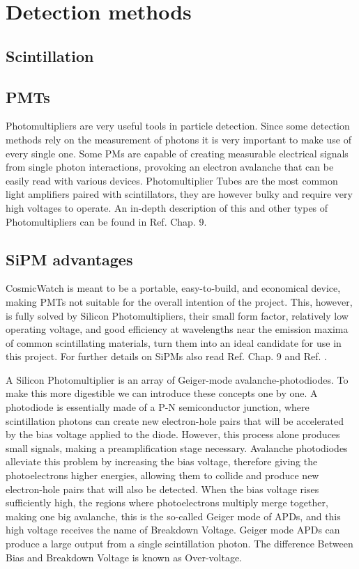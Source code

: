 \chapter{Detection methods} \label{chap:detection_methods}

\section{Scintillation}

\section{PMTs}

Photomultipliers are very useful tools in particle detection. Since some detection methods rely on the measurement of photons it is very important to make use of every single one. Some PMs are capable of creating measurable electrical signals from single photon interactions, provoking an electron avalanche that can be easily read with various devices. Photomultiplier Tubes are the most common light amplifiers paired with scintillators, they are however bulky and require very high voltages to operate. An in-depth description of this and other types of Photomultipliers can be found in Ref. \cite{knoll2010radiation} Chap. 9.

\section{SiPM advantages}

CosmicWatch is meant to be a portable, easy-to-build, and economical device, making PMTs not suitable for the overall intention of the project. This, however, is fully solved by Silicon Photomultipliers, their small form factor, relatively low operating voltage, and good efficiency at wavelengths near the emission maxima of common scintillating materials, turn them into an ideal candidate for use in this project. For further details on SiPMs also read Ref. \cite{knoll2010radiation} Chap. 9 and Ref. \cite{Onsemi_SiPM_intro}.

A Silicon Photomultiplier is an array of Geiger-mode avalanche-photodiodes. To make this more digestible we can introduce these concepts one by one. A photodiode is essentially made of a P-N semiconductor junction, where scintillation photons can create new electron-hole pairs that will be accelerated by the bias voltage applied to the diode. However, this process alone produces small signals, making a preamplification stage necessary. Avalanche photodiodes alleviate this problem by increasing the bias voltage, therefore giving the photoelectrons higher energies, allowing them to collide and produce new electron-hole pairs that will also be detected. When the bias voltage rises sufficiently high, the regions where photoelectrons multiply merge together, making one big avalanche, this is the so-called Geiger mode of APDs, and this high voltage receives the name of Breakdown Voltage. Geiger mode APDs can produce a large output from a single scintillation photon. The difference Between Bias and Breakdown Voltage is known as Over-voltage.

